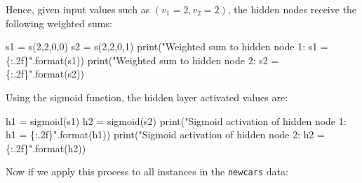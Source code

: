 \documentclass[
  letterpaper,
]{scrbook}
\newenvironment{Shaded}{\begin{snugshade}}{\end{snugshade}}
\newcommand{\BuiltInTok}[1]{\textcolor[rgb]{0.00,0.23,0.31}{#1}}
\newcommand{\DecValTok}[1]{\textcolor[rgb]{0.68,0.00,0.00}{#1}}
\newcommand{\NormalTok}[1]{\textcolor[rgb]{0.00,0.23,0.31}{#1}}
\newcommand{\OperatorTok}[1]{\textcolor[rgb]{0.37,0.37,0.37}{#1}}
\newcommand{\SpecialCharTok}[1]{\textcolor[rgb]{0.37,0.37,0.37}{#1}}
\newcommand{\StringTok}[1]{\textcolor[rgb]{0.13,0.47,0.30}{#1}}
\begin{document}
Hence, given input values such as \((v_1=2, v_2=2)\), the hidden nodes
receive the following weighted sums:

\begin{Shaded}
\begin{Highlighting}[]
\NormalTok{s1 }\OperatorTok{=}\NormalTok{ s(}\DecValTok{2}\NormalTok{,}\DecValTok{2}\NormalTok{,}\DecValTok{0}\NormalTok{,}\DecValTok{0}\NormalTok{)}
\NormalTok{s2 }\OperatorTok{=}\NormalTok{ s(}\DecValTok{2}\NormalTok{,}\DecValTok{2}\NormalTok{,}\DecValTok{0}\NormalTok{,}\DecValTok{1}\NormalTok{)}
\BuiltInTok{print}\NormalTok{(}\StringTok{"Weighted sum to hidden node 1: s1 = }\SpecialCharTok{\{:.2f\}}\StringTok{"}\NormalTok{.}\BuiltInTok{format}\NormalTok{(s1))}
\BuiltInTok{print}\NormalTok{(}\StringTok{"Weighted sum to hidden node 2: s2 = }\SpecialCharTok{\{:.2f\}}\StringTok{"}\NormalTok{.}\BuiltInTok{format}\NormalTok{(s2))}
\end{Highlighting}
\end{Shaded}

Using the sigmoid function, the hidden layer activated values are:

\begin{Shaded}
\begin{Highlighting}[]
\NormalTok{h1 }\OperatorTok{=}\NormalTok{ sigmoid(s1)}
\NormalTok{h2 }\OperatorTok{=}\NormalTok{ sigmoid(s2)}
\BuiltInTok{print}\NormalTok{(}\StringTok{"Sigmoid activation of hidden node 1: h1 = }\SpecialCharTok{\{:.2f\}}\StringTok{"}\NormalTok{.}\BuiltInTok{format}\NormalTok{(h1))}
\BuiltInTok{print}\NormalTok{(}\StringTok{"Sigmoid activation of hidden node 2: h2 = }\SpecialCharTok{\{:.2f\}}\StringTok{"}\NormalTok{.}\BuiltInTok{format}\NormalTok{(h2))}
\end{Highlighting}
\end{Shaded}

Now if we apply this process to all instances in the \texttt{newcars}
data:
\end{document}
